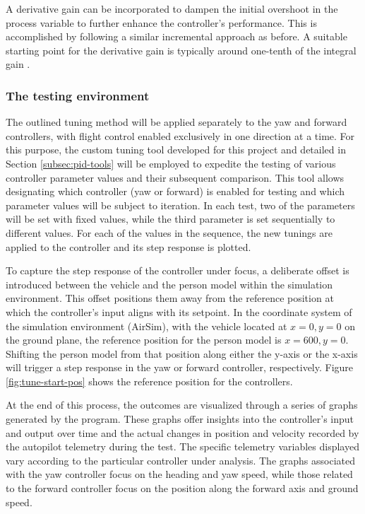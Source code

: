 A derivative gain can be incorporated to dampen the initial overshoot in the process variable to further enhance the controller's performance. This is accomplished by following a similar incremental approach as before. A suitable starting point for the derivative gain is typically around one-tenth of the integral gain \cite{pid-tuning}.


\subsubsection{The testing environment}

The outlined tuning method will be applied separately to the yaw and forward controllers, with flight control enabled exclusively in one direction at a time. For this purpose, the custom tuning tool developed for this project and detailed in Section \ref{subsec:pid-tools} will be employed to expedite the testing of various controller parameter values and their subsequent comparison. This tool allows designating which controller (yaw or forward) is enabled for testing and which parameter values will be subject to iteration. In each test, two of the parameters will be set with fixed values, while the third parameter is set sequentially to different values. For each of the values in the sequence, the new tunings are applied to the controller and its step response is plotted.

To capture the step response of the controller under focus, a deliberate offset is introduced between the vehicle and the person model within the simulation environment. This offset positions them away from the reference position at which the controller's input aligns with its setpoint. In the coordinate system of the simulation environment (AirSim), with the vehicle located at $x=0, y=0$ on the ground plane, the reference position for the person model is $x=600, y=0$. Shifting the person model from that position along either the y-axis or the x-axis will trigger a step response in the yaw or forward controller, respectively. Figure \ref{fig:tune-start-pos} shows the reference position for the controllers.

At the end of this process, the outcomes are visualized through a series of graphs generated by the program. These graphs offer insights into the controller's input and output over time and the actual changes in position and velocity recorded by the autopilot telemetry during the test. The specific telemetry variables displayed vary according to the particular controller under analysis. The graphs associated with the yaw controller focus on the heading and yaw speed, while those related to the forward controller focus on the position along the forward axis and ground speed.

